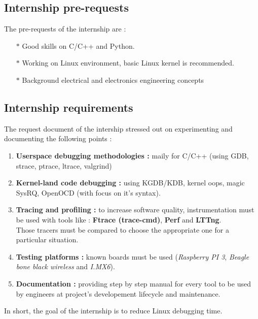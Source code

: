   
\subsection{Internship pre-requests}

The pre-requests of the internship are : 
\begin{itemize}
	\item[$\ast$] {Good skills on C/C++ and Python.}
	\item[$\ast$] {Working on Linux environment, basic Linux kernel is recommended.}
	\item[$\ast$] {Background electrical and electronics engineering concepts}
\end{itemize}


\subsection{Internship requirements}
The request document of the intership stressed out on experimenting and documenting the following points :

\begin{enumerate}
	\item \textbf{Userspace debugging methodologies : } maily for C/C++ (using GDB, strace, ptrace, ltrace, valgrind)
	
	\item \textbf{Kernel-land code debugging : } using KGDB/KDB, kernel oops, magic SysRQ, OpenOCD (with focus on it's syntax).
	
	\item \textbf{Tracing and profiling : } to increase software quality, instrumentation must be used with tools like : \textbf{Ftrace (trace-cmd)}, \textbf{Perf} and \textbf{LTTng}.\\
Those tracers must be compared  to choose the appropriate one for a particular situation.

	\item \textbf{Testing platforms : } known boards must be used (\textit{Raspberry PI 3}, \textit{Beagle bone black wireless} and \textit{I.MX6}).
	
	\item \textbf{Documentation : } providing step by step manual for every tool to be used by engineers at project's developement lifecycle and maintenance.
\end{enumerate}


\begin{center}\Large
\color{red}In short, the goal of the internship is to reduce Linux debugging time.
\end{center}


